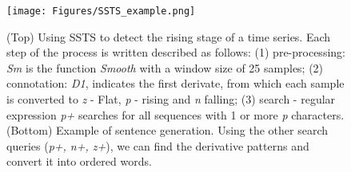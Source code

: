 \begin{figure}
    \centering
    \texttt{[image: Figures/SSTS\_example.png]}
    \caption{(Top) Using SSTS to detect the rising stage of a time series. Each step of the process is written described as follows: (1) pre-processing: \textit{Sm} is the function \textit{Smooth} with a window size of 25 samples; (2) connotation: \textit{D1}, indicates the first derivate, from which each sample is converted to \textit{z} - Flat, \textit{p} - rising and \textit{n} falling; (3) search - regular expression \textit{p+} searches for all sequences with 1 or more \textit{p} characters. (Bottom) Example of sentence generation. Using the other search queries (\textit{p+, n+, z+}), we can find the derivative patterns and convert it into ordered words.}
    \label{fig:SSTS_example}
\end{figure}